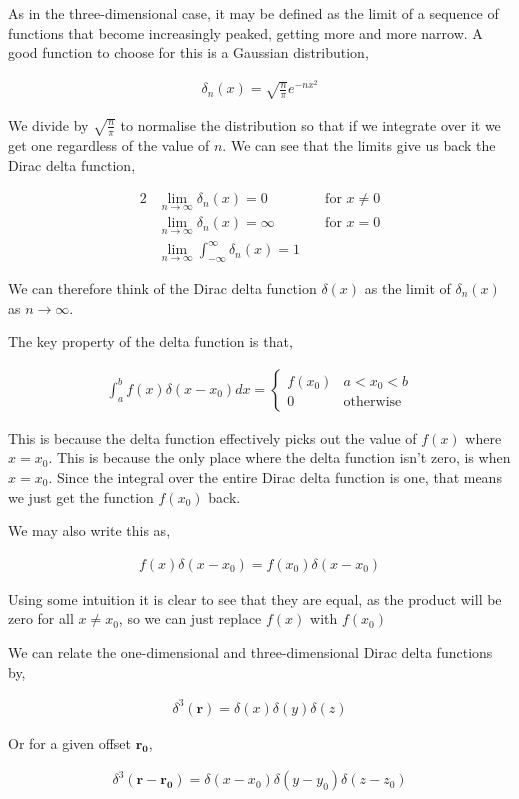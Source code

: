\documentclass[11pt]{amsart}
\begin{document}
As in the three-dimensional case, it may be defined as the limit of a sequence of functions that become increasingly peaked, getting more and more narrow. A good function to choose for this is a Gaussian distribution,

\begin{align*}
  \delta_n(x) = \sqrt{\frac{n}{\pi}} e^{-nx^2}
\end{align*}

We divide by $\sqrt{\frac{n}{\pi}}$ to normalise the distribution so that if we integrate over it we get one regardless of the value of $n$. We can see that the limits give us back the Dirac delta function,

\begin{alignat*}{2}
  &\lim_{n \to \infty} \delta_n(x) = 0 \qquad &&\text{for } x\neq0 \\
  &\lim_{n \to \infty} \delta_n(x) = \infty \qquad &&\text{for } x = 0 \\
  &\lim_{n \to \infty} \int_{-\infty}^{\infty} \delta_n(x) = 1
\end{alignat*}

We can therefore think of the Dirac delta function $\delta(x)$ as the limit of $\delta_n(x)$ as $n \to \infty$.

The key property of the delta function is that,

\begin{align*}
  \int_a^b f(x) \delta(x - x_0) dx =
  \begin{cases}
    f(x_0) & a < x_0 < b \\
    0 & \text{otherwise}
  \end{cases}
\end{align*}

This is because the delta function effectively picks out the value of $f(x)$ where $x = x_0$. This is because the only place where the delta function isn't zero, is when $x = x_0$. Since the integral over the entire Dirac delta function is one, that means we just get the function $f(x_0)$ back.

We may also write this as,

\begin{align*}
  f(x)\delta(x - x_0) = f(x_0)\delta(x - x_0)
\end{align*}

Using some intuition it is clear to see that they are equal, as the product will be zero for all $x \neq x_0$, so we can just replace $f(x)$ with $f(x_0)$

We can relate the one-dimensional and three-dimensional Dirac delta functions by,

\begin{align*}
  \delta^3(\mathbf{r}) = \delta(x)\delta(y)\delta(z)
\end{align*}

Or for a given offset $\mathbf{r_0}$,

\begin{align*}
  \delta^3(\mathbf{r} - \mathbf{r_0}) = \delta(x - x_0)\delta(y - y_0)\delta(z - z_0)
\end{align*}
\end{document}
